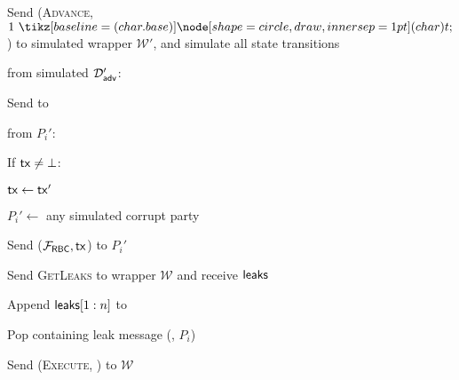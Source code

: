 \begin{bbox}[title={$\mathcal{S}_\mathsf{Bracha}$}]
    \quad Send (\textsc{Advance}, $1 \token$) to simulated wrapper $\mathcal{W}'$, and simulate all state transitions 
    
\OnInput {} from simulated $\mathcal{D}_{{\mathsf {adv}}}'$:

    \quad Send  to \Env
    
\OnInput {} from $P_i'$:

    \quad If ${\mathsf {tx}} \neq \bot$:
    
        \qquad ${\mathsf {tx}} \leftarrow {\mathsf {tx'}}$
        
        \qquad $P_i' \leftarrow$ any simulated corrupt party
        
        \qquad Send ($\mathcal{F}_{{\mathsf {RBC}}}, {\mathsf {tx}}$) to $P_i'$
        
        \qquad Send \textsc{GetLeaks} to wrapper $\mathcal{W}$ and receive ${\mathsf {leaks}}$
        
        \qquad Append ${\mathsf {leaks}}[1:n]$ to 
        
    \quad Pop  containing leak message (, $P_i$)
    
    \quad Send (\textsc{Execute}, ) to $\mathcal{W}$
\end{bbox}